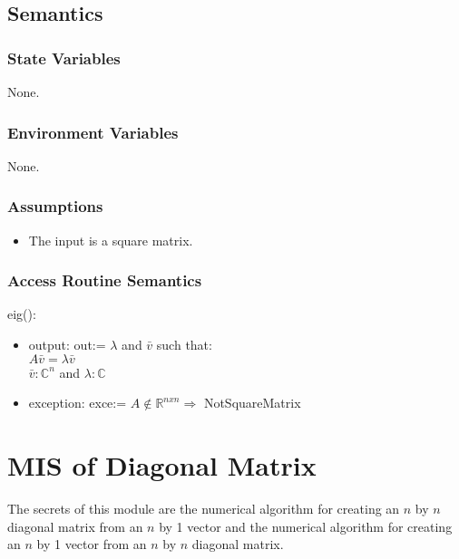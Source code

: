 \documentclass[12pt, titlepage]{article}
\begin{document}
\subsection{Semantics}

\subsubsection{State Variables}

None.

\subsubsection{Environment Variables}

None.

\subsubsection{Assumptions}

\begin{itemize}
	\item The input is a square matrix. 
\end{itemize}

\subsubsection{Access Routine Semantics}

\noindent eig():
\begin{itemize}
	\item output: out:= $\lambda$ and $\bar{v}$ such that:\\
	$A\bar{v} = \lambda \bar{v}$ \\
	$\bar{v} : \mathbb{C}^{n}$ and $\lambda : \mathbb{C}$\\
	\item exception: exce:= $A \not\in \mathbb{R}^{nxn} \Rightarrow$ 
	NotSquareMatrix 
\end{itemize}

\newpage

\section{MIS of Diagonal Matrix} 

The secrets of this module are the numerical algorithm for creating an $n$ by 
$n$ diagonal 
matrix from an $n$ by 1 vector and the numerical algorithm for creating an $n$ 
by 1 vector from an $n$ by $n$ diagonal 
matrix. 
\end{document}

